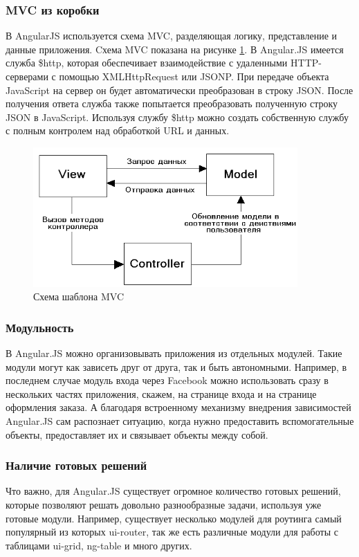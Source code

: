 \subsubsection*{MVC из коробки}
В AngularJS используется схема MVC, разделяющая логику, представление и данные приложения.
Cхема MVC показана на рисунке \ref{mvc}.
В Angular.JS имеется служба \$http, которая обеспечивает взаимодействие с удаленными
HTTP-серверами с помощью XMLHttpRequest или JSONP. При передаче объекта JavaScript
на сервер он будет автоматически преобразован в строку JSON. После получения ответа
служба также попытается преобразовать полученную строку JSON в JavaScript.
Используя службу \$http можно создать собственную службу с полным контролем над
обработкой URL и данных.

\begin{figure}
  \centering
  \includegraphics[width=0.9\textwidth]{images/mvc.png}
  \caption{Схема шаблона MVC\label{mvc}}
\end{figure}

\subsubsection*{Модульность}
В Angular.JS можно организовывать приложения из отдельных модулей. Такие модули
могут как зависеть друг от друга, так и быть автономными. Например, в последнем
случае модуль входа через Facebook можно использовать сразу в нескольких частях приложения,
скажем, на странице входа и на странице оформления заказа. А благодаря встроенному механизму
внедрения зависимостей Angular.JS сам распознает ситуацию, когда нужно предоставить
вспомогательные объекты, предоставляет их и связывает объекты между собой.
\subsubsection*{Наличие готовых решений}
Что важно, для Angular.JS существует огромное количество готовых решений, которые
позволяют решать довольно разнообразные задачи, используя уже готовые модули.
Например, существует несколько модулей для роутинга самый популярный из которых
ui-router, так же есть различные модули для работы с таблицами ui-grid, ng-table
и много других.
